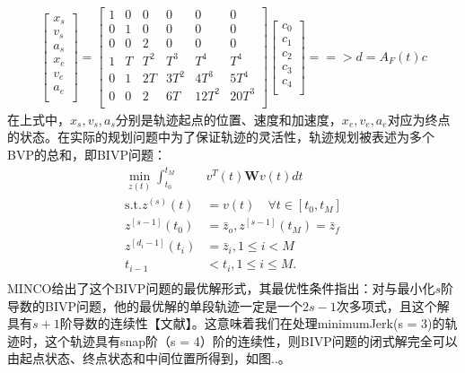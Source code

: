 \documentclass[master,academic]{ysuthesis} %
\begin{document}
		\begin{equation}
			\begin{aligned}
				\left[ \begin{array}{c}
				x_s\\
				v_s\\
				a_s\\
				x_e\\
				v_e\\
				a_e\\
				\end{array} \right] =\left[ \begin{matrix}
				1&		0&		0&		0&		0&		0\\
				0&		1&		0&		0&		0&		0\\
				0&		0&		2&		0&		0&		0\\
				1&		T&		T^2&		T^3&		T^4&		T^4\\
				0&		1&		2T&		3T^2&		4T^3&		5T^4\\
				0&		0&		2&		6T&		12T^2&		20T^3\\
				\end{matrix} \right] \left[ \begin{array}{c}
				c_0\\
				c_1\\
				c_2\\
				c_3\\
				c_4\\
				\end{array} \right] ==>d=A_F(t) c
			\end{aligned}
		\end{equation}
		在上式中，$x_s,v_s,a_s$分别是轨迹起点的位置、速度和加速度，$x_e,v_e,a_e$对应为终点的状态。在实际的规划问题中为了保证轨迹的灵活性，轨迹规划被表述为多个BVP的总和，即BIVP问题：
		\begin{equation}
			\begin{aligned}
				\min_{z(t)}\int_{t_0}^{t_M}&v^T(t)\mathbf{W}v(t)dt\\
				\text{s.t}.z^{( s )}(t) &=v(t) \quad \forall t\in \left[ t_0,t_M \right]\\
				z^{\left[ s-1 \right]}( t_0 ) &=\bar{z}_o,z^{\left[ s-1 \right]}( t_M ) =\bar{z}_f\\
				z^{\left[ d_i-1 \right]}( t_i ) &=\bar{z}_i,1\leq i<M\\
				t_{i-1}&<t_i,1\leq i\leq M.\\
			\end{aligned}
		\end{equation}
		MINCO给出了这个BIVP问题的最优解形式，其最优性条件指出：对与最小化$s$阶导数的BIVP问题，他的最优解的单段轨迹一定是一个$2s-1$次多项式，且这个解具有$s+1$阶导数的连续性【文献】。这意味着我们在处理minimumJerk(s = 3)的轨迹时，这个轨迹具有snap阶（s = 4）阶的连续性，则BIVP问题的闭式解完全可以由起点状态、终点状态和中间位置所得到，如图..。
\end{document}
